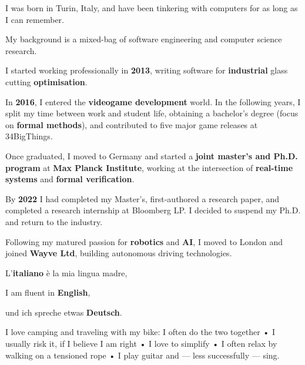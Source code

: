 
I was born in Turin, Italy, and have been tinkering with computers for as long as I can remember.  

My background is a mixed-bag of software engineering and computer science research. 


I started working professionally in \textbf{2013}, writing software for \textbf{industrial} glass cutting \textbf{optimisation}. 

In \textbf{2016}, I entered the \textbf{videogame development} world. In the following years, I split my time between work and student life, obtaining a bachelor's degree (focus on \textbf{formal methods}), and contributed to five major game releases at 34BigThings.

Once graduated, I moved to Germany and started a \textbf{joint master's and Ph.D. program} at \textbf{Max Planck Institute}, working at the intersection of \textbf{real-time systems} and \textbf{formal verification}. 

By \textbf{2022} I had completed my Master's, first-authored a research paper, and completed a research internship at Bloomberg LP. I decided to suspend my Ph.D. and return to the industry. 

Following my matured passion for \textbf{robotics} and \textbf{AI}, I moved to London and joined \textbf{Wayve Ltd}, building autonomous driving technologies. 


L'\textbf{italiano} è la mia lingua madre,

I am fluent in \textbf{English},

und ich spreche etwas \textbf{Deutsch}.


I love camping and traveling with my bike: I often do the two together • 
I usually risk it, if I believe I am right • 
I love to simplify • 
I often relax by walking on a tensioned rope • 
I play guitar and --- less successfully --- sing.

